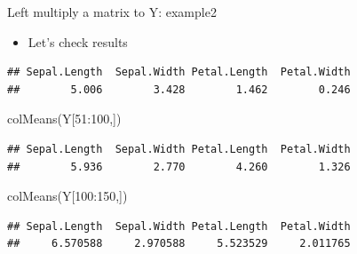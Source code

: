 \documentclass[
  ignorenonframetext,
]{beamer}
\newenvironment{Shaded}{\begin{snugshade}}{\end{snugshade}}
\newcommand{\CommentTok}[1]{\textcolor[rgb]{0.56,0.35,0.01}{\textit{#1}}}
\newcommand{\DecValTok}[1]{\textcolor[rgb]{0.00,0.00,0.81}{#1}}
\newcommand{\FunctionTok}[1]{\textcolor[rgb]{0.00,0.00,0.00}{#1}}
\newcommand{\NormalTok}[1]{#1}
\newcommand{\SpecialCharTok}[1]{\textcolor[rgb]{0.00,0.00,0.00}{#1}}
\providecommand{\tightlist}{%
  \setlength{\itemsep}{0pt}\setlength{\parskip}{0pt}}
\begin{document}
\begin{frame}[fragile]{Left multiply a matrix to Y: example2}
\protect\hypertarget{left-multiply-a-matrix-to-y-example2-1}{}
\begin{itemize}
\tightlist
\item
  Let's check results
\end{itemize}

\begin{Shaded}
\end{Shaded}

\begin{verbatim}
## Sepal.Length  Sepal.Width Petal.Length  Petal.Width 
##        5.006        3.428        1.462        0.246
\end{verbatim}

\begin{Shaded}
\begin{Highlighting}[]
\FunctionTok{colMeans}\NormalTok{(Y[}\DecValTok{51}\SpecialCharTok{:}\DecValTok{100}\NormalTok{,])}
\end{Highlighting}
\end{Shaded}

\begin{verbatim}
## Sepal.Length  Sepal.Width Petal.Length  Petal.Width 
##        5.936        2.770        4.260        1.326
\end{verbatim}

\begin{Shaded}
\begin{Highlighting}[]
\FunctionTok{colMeans}\NormalTok{(Y[}\DecValTok{100}\SpecialCharTok{:}\DecValTok{150}\NormalTok{,])}
\end{Highlighting}
\end{Shaded}

\begin{verbatim}
## Sepal.Length  Sepal.Width Petal.Length  Petal.Width 
##     6.570588     2.970588     5.523529     2.011765
\end{verbatim}
\end{frame}
\end{document}
